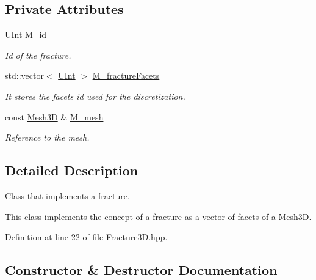 \subsection*{Private Attributes}
\begin{DoxyCompactItemize}
\item 
\hyperlink{namespaceFVCode3D_a4bf7e328c75d0fd504050d040ebe9eda}{U\+Int} \hyperlink{classFVCode3D_1_1Fracture3D_a38b5200e499e51977db8f816a95eccd9}{M\+\_\+id}
\begin{DoxyCompactList}\small\item\em Id of the fracture. \end{DoxyCompactList}\item 
std\+::vector$<$ \hyperlink{namespaceFVCode3D_a4bf7e328c75d0fd504050d040ebe9eda}{U\+Int} $>$ \hyperlink{classFVCode3D_1_1Fracture3D_ab2da921dc007666c4f9111b3204f0072}{M\+\_\+fracture\+Facets}
\begin{DoxyCompactList}\small\item\em It stores the facets id used for the discretization. \end{DoxyCompactList}\item 
const \hyperlink{classFVCode3D_1_1Mesh3D}{Mesh3D} \& \hyperlink{classFVCode3D_1_1Fracture3D_ab3ceda8a7f2e67ee5d94a08be2ba2977}{M\+\_\+mesh}
\begin{DoxyCompactList}\small\item\em Reference to the mesh. \end{DoxyCompactList}\end{DoxyCompactItemize}


\subsection{Detailed Description}
Class that implements a fracture. 

This class implements the concept of a fracture as a vector of facets of a \hyperlink{classFVCode3D_1_1Mesh3D}{Mesh3D}. 

Definition at line \hyperlink{Fracture3D_8hpp_source_l00022}{22} of file \hyperlink{Fracture3D_8hpp_source}{Fracture3\+D.\+hpp}.



\subsection{Constructor \& Destructor Documentation}

